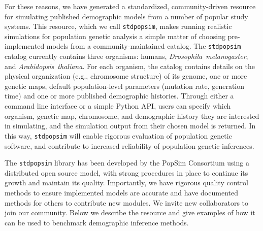 \documentclass[12pt,halfline,a4paper]{ouparticle}
\newcommand{\stdpopsim}{\texttt{stdpopsim}\xspace}
\begin{document}
For these reasons, we have generated a standardized, community-driven resource
for simulating published demographic models from a number of popular study systems.
This resource, which we call \stdpopsim, makes running
realistic simulations for population genetic analysis a simple matter of
choosing pre-implemented models from a community-maintained catalog.
The \stdpopsim catalog currently contains three organisms: humans,
\emph{Drosophila~melanogaster}, and \emph{Arabidopsis~thaliana}. For each
organism, the catalog contains details on the physical organization (e.g., chromosome structure)
of its genome, one or more genetic maps, default population-level parameters (mutation rate,
generation time) and one or more published demographic histories. Through
either a command line interface or a simple Python API, users can specify which
organism, genetic map, chromosome, and demographic history they are interested in simulating, and the
simulation output from their chosen model is returned.
In this way, \stdpopsim will enable rigorous evaluation of population genetic software,
and contribute to increased reliability of population genetic inferences.

The \stdpopsim library has been developed by the PopSim Consortium using a
distributed open source model, with strong procedures in place
to continue its growth and maintain its quality.
Importantly, we have rigorous quality control methods to ensure implemented models are accurate
and have documented methods for others to contribute new modules.
We invite new collaborators to join our community.
Below we describe the resource and give
examples of how it can be used to benchmark demographic inference methods.
\end{document}
